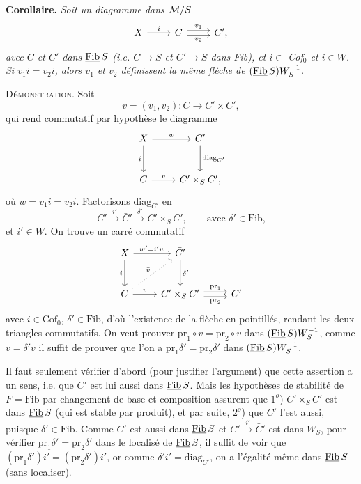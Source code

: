 \textbf{Corollaire.} \textit{Soit un diagramme dans $\mathcal{M}/S$}
\[
\begin{tikzcd}
X \arrow[r, "i"] & C \arrow[r, shift left, "v_1"] \arrow[r, shift right, "v_2"'] & C',
\end{tikzcd}
\]
\textit{avec $C$ et $C'$ dans $\underline{\mathrm{Fib}}\, S$ (i.e. $C\longrightarrow S$ et $C'\longrightarrow S$ dans Fib), et $i\in$ Cof$_0$ et $i\in W$. Si
$v_1i=v_2i$, alors $v_1$ et $v_2$ définissent la même flèche de $(\underline{\mathrm{Fib}}\, S)W_S^{-1}$.}

\textsc{Démonstration}. Soit
\[
v=(v_1,v_2):C\longrightarrow C'\times C',
\]
 qui rend commutatif par hypothèse le diagramme
\[
\begin{tikzcd}[row sep=large]
X \arrow[r, "w"] \arrow[d, "i"'] & C' \arrow[d, "\mathrm{diag}_{C'}"] \\
C \arrow[r, "v"] & C'\times_S C',
\end{tikzcd}
\]
où $w=v_1i=v_2i$. Factorisons $\mathrm{diag}_{C'}$ en
\[
C'\xrightarrow{\ i'\ }\bar{C}'\xrightarrow{\ \delta'\ }C'\times_S C', \qquad \text{avec $\delta'\in\mathrm{Fib}$,}
\]
et $i'\in W$. On trouve un carré commutatif
\[
\begin{tikzcd}[row sep=large]
X \arrow[r, "w'=i'w"] \arrow[d, "i"'] & \bar{C}' \arrow[d, "\delta'"] & \\
C \arrow[r, "v"] \arrow[ur, dotted, "\bar{v}"] & C'\times_S C' \arrow[r, shift left, "\mathrm{pr}_1"] \arrow[r, shift right, "\mathrm{pr}_2"'] & C'
\end{tikzcd}
\]
avec $i\in\mathrm{Cof}_0$, $\delta'\in\mathrm{Fib}$, d'où l'existence de la flèche en pointillés, rendant les deux triangles
commutatifs. On veut prouver $\mathrm{pr}_1\circ v=\mathrm{pr}_2\circ v$ dans $(\underline{\mathrm{Fib}}\, S)W_S^{-1}$, comme $v=\delta'\bar{v}$ il suffit
de prouver que l'on a $\mathrm{pr}_1\delta'=\mathrm{pr}_2\delta'$ dans $(\underline{\mathrm{Fib}}\, S)W_S^{-1}$.

Il faut seulement vérifier d'abord (pour justifier l'argument) que cette assertion a un sens,
i.e. que $\bar{C}'$ est lui aussi dans $\underline{\mathrm{Fib}}\, S$. Mais les hypothèses de stabilité de $F=\mathrm{Fib}$ par
changement de base et composition assurent que $1^o$) $C'\times_S C'$ est dans $\underline{\mathrm{Fib}}\, S$ (qui est
stable par produit), et par suite, $2^o$) que $\bar{C}'$ l'est aussi, puisque $\delta'\in\mathrm{Fib}$. Comme $C'$ est
aussi dans $\underline{\mathrm{Fib}}\, S$ et $C'\xrightarrow{\ i'\ }\bar{C}'$ est dans $W_S$, pour vérifier $\mathrm{pr}_1\delta'=\mathrm{pr}_2\delta'$ dans le localisé de
$\underline{\mathrm{Fib}}\, S$, il suffit de voir que $(\mathrm{pr}_1\delta')i'=(\mathrm{pr}_2\delta')i'$, or comme $\delta'i'=\mathrm{diag}_{C'}$, on a l'égalité même
dans $\underline{\mathrm{Fib}}\, S$ (sans localiser).

